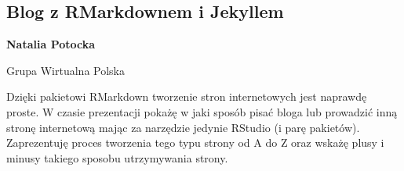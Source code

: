 \documentclass[\main/boa.tex]{subfiles}
\begin{document}
\subsection{Blog z RMarkdownem i Jekyllem }

\begin{minipage}{0.915\textwidth}
	\centering
  {\bf {} Natalia Potocka }
\end{minipage}


\begin{affiliations}
\begin{minipage}{0.915\textwidth}
\centering
Grupa Wirtualna Polska \\[-2pt]
\end{minipage}
\end{affiliations}

\vskip 0.3cm

Dzięki pakietowi RMarkdown tworzenie stron internetowych jest naprawdę proste. W czasie prezentacji pokażę w jaki sposób pisać bloga lub prowadzić inną stronę internetową mając za narzędzie jedynie RStudio (i parę pakietów). Zaprezentuję proces tworzenia tego typu strony od A do Z oraz wskażę plusy i minusy takiego sposobu utrzymywania strony. 
\end{document}

